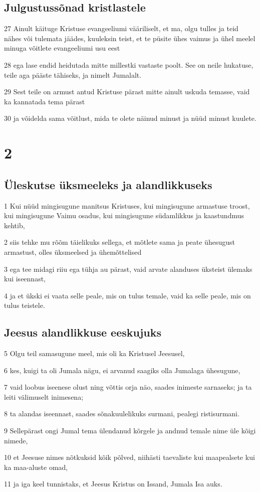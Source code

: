 \section*{Julgustussõnad kristlastele}

\par 27 Ainult käituge Kristuse evangeeliumi vääriliselt, et ma, olgu tulles ja teid nähes või tulemata jäädes, kuuleksin teist, et te püsite ühes vaimus ja ühel meelel minuga võitlete evangeeliumi usu eest
\par 28 ega lase endid heidutada mitte millestki vastaste poolt. See on neile hukatuse, teile aga pääste tähiseks, ja nimelt Jumalalt.
\par 29 Sest teile on armust antud Kristuse pärast mitte ainult uskuda temasse, vaid ka kannatada tema pärast
\par 30 ja võidelda sama võitlust, mida te olete näinud minust ja nüüd minust kuulete.


\chapter{2}

\section*{Üleskutse üksmeeleks ja alandlikkuseks}

\par 1 Kui nüüd mingisugune manitsus Kristuses, kui mingisugune armastuse troost, kui mingisugune Vaimu osadus, kui mingisugune südamlikkus ja kaastundmus kehtib,
\par 2 siis tehke mu rõõm täielikuks sellega, et mõtlete sama ja peate ühesugust armastust, olles üksmeelsed ja ühemõttelised
\par 3 ega tee midagi riiu ega tühja au pärast, vaid arvate alanduses üksteist ülemaks kui iseennast,
\par 4 ja et ükski ei vaata selle peale, mis on tulus temale, vaid ka selle peale, mis on tulus teistele.

\section*{Jeesus alandlikkuse eeskujuks}

\par 5 Olgu teil samasugune meel, mis oli ka Kristusel Jeesusel,
\par 6 kes, kuigi ta oli Jumala nägu, ei arvanud saagiks olla Jumalaga ühesugune,
\par 7 vaid loobus iseenese olust ning võttis orja näo, saades inimeste sarnaseks; ja ta leiti välimuselt inimesena;
\par 8 ta alandas iseennast, saades sõnakuulelikuks surmani, pealegi ristisurmani.
\par 9 Sellepärast ongi Jumal tema ülendanud kõrgele ja andnud temale nime üle kõigi nimede,
\par 10 et Jeesuse nimes nõtkuksid kõik põlved, niihästi taevaliste kui maapealsete kui ka maa-aluste omad,
\par 11 ja iga keel tunnistaks, et Jeesus Kristus on Issand, Jumala Isa auks.

